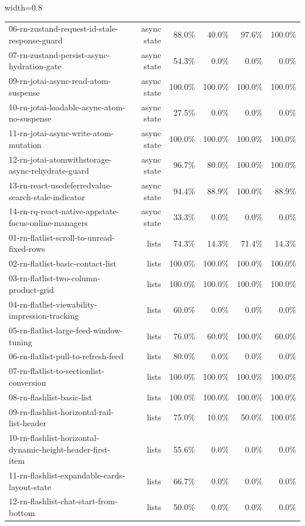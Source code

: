 \begin{table}[htbp]
\begin{adjustbox}{width=0.8\textwidth}
\begin{tabular}{lrrrrr}
06-rn-zustand-request-id-stale-response-guard & async state & 88.0\% & 40.0\% & 97.6\% & 100.0\% \\
07-rn-zustand-persist-async-hydration-gate & async state & 54.3\% & 0.0\% & 0.0\% & 0.0\% \\
09-rn-jotai-async-read-atom-suspense & async state & 100.0\% & 100.0\% & 100.0\% & 100.0\% \\
10-rn-jotai-loadable-async-atom-no-suspense & async state & 27.5\% & 0.0\% & 0.0\% & 0.0\% \\
11-rn-jotai-async-write-atom-mutation & async state & 100.0\% & 100.0\% & 100.0\% & 100.0\% \\
12-rn-jotai-atomwithstorage-async-rehydrate-guard & async state & 96.7\% & 80.0\% & 100.0\% & 100.0\% \\
13-rn-react-usedeferredvalue-search-stale-indicator & async state & 94.4\% & 88.9\% & 100.0\% & 88.9\% \\
14-rn-rq-react-native-appstate-focus-online-managers & async state & 33.3\% & 0.0\% & 0.0\% & 0.0\% \\
01-rn-flatlist-scroll-to-unread-fixed-rows & lists & 74.3\% & 14.3\% & 71.4\% & 14.3\% \\
02-rn-flatlist-basic-contact-list & lists & 100.0\% & 100.0\% & 100.0\% & 100.0\% \\
03-rn-flatlist-two-column-product-grid & lists & 100.0\% & 100.0\% & 100.0\% & 100.0\% \\
04-rn-flatlist-viewability-impression-tracking & lists & 60.0\% & 0.0\% & 0.0\% & 0.0\% \\
05-rn-flatlist-large-feed-window-tuning & lists & 76.0\% & 60.0\% & 100.0\% & 60.0\% \\
06-rn-flatlist-pull-to-refresh-feed & lists & 80.0\% & 0.0\% & 0.0\% & 0.0\% \\
07-rn-flatlist-to-sectionlist-conversion & lists & 100.0\% & 100.0\% & 100.0\% & 100.0\% \\
08-rn-flashlist-basic-list & lists & 100.0\% & 100.0\% & 100.0\% & 100.0\% \\
09-rn-flashlist-horizontal-rail-list-header & lists & 75.0\% & 10.0\% & 50.0\% & 100.0\% \\
10-rn-flashlist-horizontal-dynamic-height-header-first-item & lists & 55.6\% & 0.0\% & 0.0\% & 0.0\% \\
11-rn-flashlist-expandable-cards-layout-state & lists & 66.7\% & 0.0\% & 0.0\% & 0.0\% \\
12-rn-flashlist-chat-start-from-bottom & lists & 50.0\% & 0.0\% & 0.0\% & 0.0\% \\

\end{tabular}
\end{adjustbox}
\end{table}
